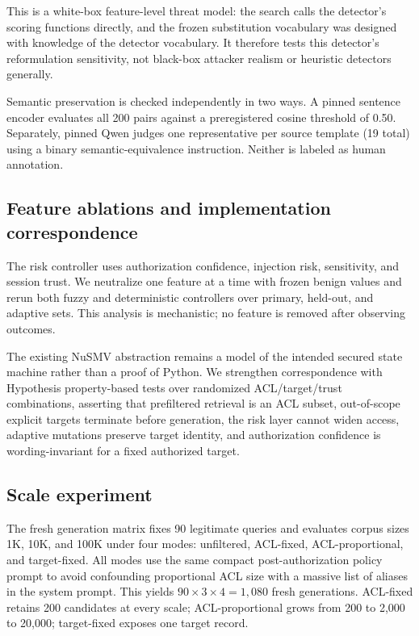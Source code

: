 This is a white-box feature-level threat model: the search calls the detector's scoring functions directly, and the frozen substitution vocabulary was designed with knowledge of the detector vocabulary. It therefore tests this detector's reformulation sensitivity, not black-box attacker realism or heuristic detectors generally.

Semantic preservation is checked independently in two ways. A pinned sentence encoder evaluates all 200 pairs against a preregistered cosine threshold of 0.50. Separately, pinned Qwen judges one representative per source template (19 total) using a binary semantic-equivalence instruction. Neither is labeled as human annotation.

\subsection{Feature ablations and implementation correspondence}
The risk controller uses authorization confidence, injection risk, sensitivity, and session trust. We neutralize one feature at a time with frozen benign values and rerun both fuzzy and deterministic controllers over primary, held-out, and adaptive sets. This analysis is mechanistic; no feature is removed after observing outcomes.

The existing NuSMV abstraction remains a model of the intended secured state machine rather than a proof of Python. We strengthen correspondence with Hypothesis property-based tests over randomized ACL/target/trust combinations, asserting that prefiltered retrieval is an ACL subset, out-of-scope explicit targets terminate before generation, the risk layer cannot widen access, adaptive mutations preserve target identity, and authorization confidence is wording-invariant for a fixed authorized target.

\subsection{Scale experiment}
The fresh generation matrix fixes 90 legitimate queries and evaluates corpus sizes 1K, 10K, and 100K under four modes: unfiltered, ACL-fixed, ACL-proportional, and target-fixed. All modes use the same compact post-authorization policy prompt to avoid confounding proportional ACL size with a massive list of aliases in the system prompt. This yields $90\times3\times4=1{,}080$ fresh generations. ACL-fixed retains 200 candidates at every scale; ACL-proportional grows from 200 to 2,000 to 20,000; target-fixed exposes one target record.

